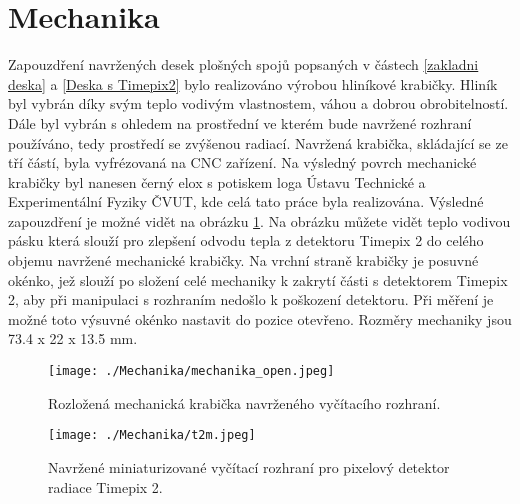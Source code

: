 \section{Mechanika}
	Zapouzdření navržených desek plošných spojů popsaných v částech \ref{zakladni deska} a \ref{Deska s Timepix2} bylo realizováno výrobou hliníkové krabičky. Hliník byl vybrán díky svým teplo vodivým vlastnostem, váhou a dobrou obrobitelností. Dále byl vybrán s ohledem na prostřední ve kterém bude navržené rozhraní používáno, tedy prostředí se zvýšenou radiací. Navržená krabička, skládající se ze tří částí, byla vyfrézovaná na CNC zařízení. Na výsledný povrch mechanické krabičky byl nanesen černý elox s potiskem loga Ústavu Technické a Experimentální Fyziky ČVUT, kde celá tato práce byla realizována. Výsledné zapouzdření je možné vidět na obrázku \ref{fig:mechanika}. Na obrázku můžete vidět teplo vodivou pásku která slouží pro zlepšení odvodu tepla z detektoru Timepix 2 do celého objemu navržené mechanické krabičky. Na vrchní straně krabičky je posuvné okénko, jež slouží po složení celé mechaniky k zakrytí části s detektorem Timepix 2, aby při manipulaci s rozhraním nedošlo k poškození detektoru. Při měření je možné toto výsuvné okénko nastavit do pozice otevřeno. Rozměry mechaniky jsou 73.4 x 22 x 13.5 mm. 
	\begin{figure}[h!]
		\centering
		\captionsetup{justification=centering}
		\texttt{[image: ./Mechanika/mechanika\_open.jpeg]}
		\caption{Rozložená mechanická krabička navrženého vyčítacího rozhraní.} 
		\label{fig:mechanika}
	\end{figure}
	\begin{figure}[h!]
		\centering
		\captionsetup{justification=centering}
		\texttt{[image: ./Mechanika/t2m.jpeg]}
		\caption{Navržené miniaturizované vyčítací rozhraní pro pixelový detektor radiace Timepix 2.} 
		\label{fig:t2m}
	\end{figure}
	